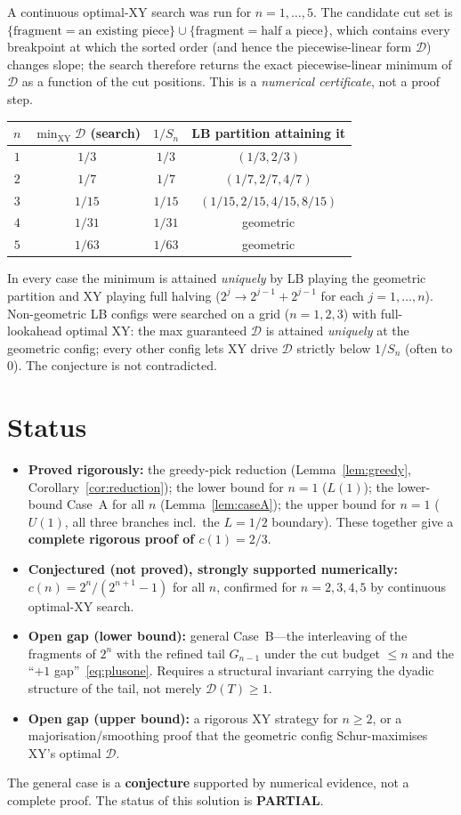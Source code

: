 \documentclass[11pt]{article}
\theoremstyle{definition}
\newcommand{\D}{\mathcal{D}}
\newcommand{\XY}{\mathrm{XY}}
\begin{document}
A continuous optimal-XY search was run for $n=1,\dots,5$. The candidate cut set
is $\{\text{fragment}=\text{an existing piece}\}\cup\{\text{fragment}=\text{half a
piece}\}$, which contains every breakpoint at which the sorted order (and hence
the piecewise-linear form $\D$) changes slope; the search therefore returns the
exact piecewise-linear minimum of $\D$ as a function of the cut positions. This
is a \emph{numerical certificate}, not a proof step.

\begin{center}
\begin{tabular}{c|c|c|c}
\toprule
$n$ & $\min_{\XY}\D$ (search) & $1/S_n$ & LB partition attaining it \\
\midrule
$1$ & $1/3$   & $1/3$   & $(1/3,2/3)$ \\
$2$ & $1/7$   & $1/7$   & $(1/7,2/7,4/7)$ \\
$3$ & $1/15$  & $1/15$  & $(1/15,2/15,4/15,8/15)$ \\
$4$ & $1/31$  & $1/31$  & geometric \\
$5$ & $1/63$  & $1/63$  & geometric \\
\bottomrule
\end{tabular}
\end{center}
In every case the minimum is attained \emph{uniquely} by LB playing the
geometric partition and XY playing full halving ($2^j\to2^{j-1}+2^{j-1}$ for
each $j=1,\dots,n$). Non-geometric LB configs were searched on a grid
($n=1,2,3$) with full-lookahead optimal XY: the max guaranteed $\D$ is attained
\emph{uniquely} at the geometric config; every other config lets XY drive $\D$
strictly below $1/S_n$ (often to $0$). The conjecture is not contradicted.

\section{Status}

\begin{itemize}[leftmargin=2em]
\item \textbf{Proved rigorously:} the greedy-pick reduction
(Lemma~\ref{lem:greedy}, Corollary~\ref{cor:reduction}); the lower bound for
$n=1$ ($L(1)$); the lower-bound Case~A for all $n$ (Lemma~\ref{lem:caseA}); the
upper bound for $n=1$ ($U(1)$, all three branches incl.\ the $L=1/2$ boundary).
These together give a \textbf{complete rigorous proof of $c(1)=2/3$}.
\item \textbf{Conjectured (not proved), strongly supported numerically:}
$c(n)=2^n/(2^{n+1}-1)$ for all $n$, confirmed for $n=2,3,4,5$ by continuous
optimal-XY search.
\item \textbf{Open gap (lower bound):} general Case~B---the interleaving of the
fragments of $2^n$ with the refined tail $G_{n-1}$ under the cut budget $\le n$
and the ``$+1$ gap''~\eqref{eq:plusone}. Requires a structural invariant carrying
the dyadic structure of the tail, not merely $\D(T)\ge 1$.
\item \textbf{Open gap (upper bound):} a rigorous XY strategy for $n\ge 2$, or a
majorisation/smoothing proof that the geometric config Schur-maximises XY's
optimal $\D$.
\end{itemize}

The general case is a \textbf{conjecture} supported by numerical evidence, not a
complete proof. The status of this solution is \textbf{PARTIAL}.
\end{document}
